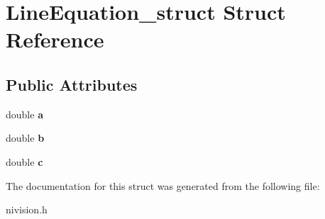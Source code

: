 \hypertarget{structLineEquation__struct}{
\section{LineEquation\_\-struct Struct Reference}
\label{structLineEquation__struct}
}
\subsection*{Public Attributes}
\begin{DoxyCompactItemize}
\item 
\hypertarget{structLineEquation__struct_af907cdec4d74ce48da6dc12ef2eaf6f1}{
double {\bfseries a}}
\label{structLineEquation__struct_af907cdec4d74ce48da6dc12ef2eaf6f1}

\item 
\hypertarget{structLineEquation__struct_a77e5a167b0d9b9845e8597f7c170490b}{
double {\bfseries b}}
\label{structLineEquation__struct_a77e5a167b0d9b9845e8597f7c170490b}

\item 
\hypertarget{structLineEquation__struct_aa8cfcd2ce253fd5579bc4e7d054c93e5}{
double {\bfseries c}}
\label{structLineEquation__struct_aa8cfcd2ce253fd5579bc4e7d054c93e5}

\end{DoxyCompactItemize}


The documentation for this struct was generated from the following file:\begin{DoxyCompactItemize}
\item 
nivision.h\end{DoxyCompactItemize}
